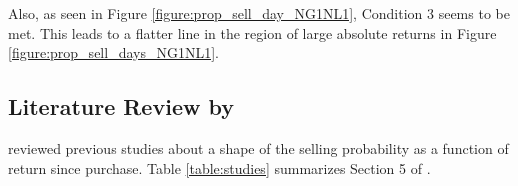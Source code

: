 \documentclass[11pt, a4paper]{article}
\begin{document}
\noindent
Also, as seen in Figure \ref{figure:prop_sell_day_NG1NL1}, Condition 3 seems to be met. This leads to a flatter line in the region of large absolute returns in Figure \ref{figure:prop_sell_days_NG1NL1}.\\

\clearpage



\begin{appendices}
\section{Literature Review by \citet{BenDavidHirshleifer12}}
	\label{appendix:bendavid_hirshleifer}
	\renewcommand*{\thetable}{A\arabic{table}}%
	\renewcommand*{\thefigure}{A\arabic{figure}}%
	\renewcommand*{\theequation}{A\arabic{equation}}%
	\setcounter{table}{0}
	\setcounter{figure}{0}
	\setcounter{equation}{0}

\citet{BenDavidHirshleifer12} reviewed previous studies about a shape of the selling probability as a function of return since purchase. Table \ref{table:studies} summarizes Section 5 of \citet{BenDavidHirshleifer12}.


\end{appendices}
\end{document}
